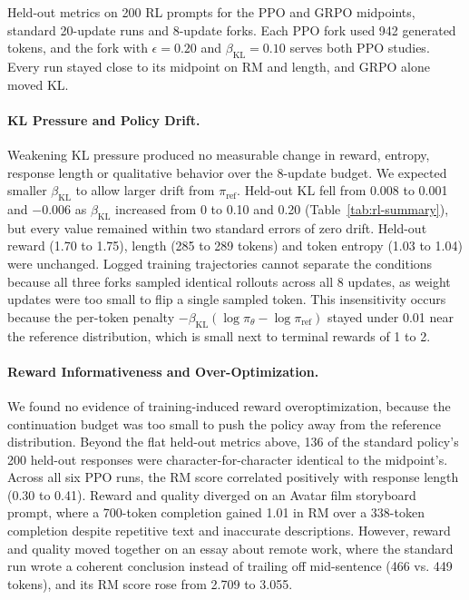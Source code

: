 \documentclass{article}
\newcommand{\tablebody}[1]{\small\setlength{\tabcolsep}{4pt}\begin{adjustbox}{max width=\linewidth}\end{adjustbox}}
\begin{document}
\begin{table}[!htb]
  \centering
  \caption{Held-out metrics on 200 RL prompts for the PPO and GRPO midpoints, standard 20-update runs and 8-update forks. Each PPO fork used 942 generated tokens, and the fork with $\epsilon = 0.20$ and $\beta_{\text{KL}} = 0.10$ serves both PPO studies. Every run stayed close to its midpoint on RM and length, and GRPO alone moved KL.}
  \label{tab:rl-summary}
  \tablebody{tables/x_rl_summary.tex}
\end{table}

\paragraph{KL Pressure and Policy Drift.} Weakening KL pressure produced no measurable change in reward, entropy, response length or qualitative behavior over the 8-update budget. We expected smaller $\beta_{\text{KL}}$ to allow larger drift from $\pi_{\text{ref}}$. Held-out KL fell from 0.008 to 0.001 and $-0.006$ as $\beta_{\text{KL}}$ increased from 0 to 0.10 and 0.20 (Table~\ref{tab:rl-summary}), but every value remained within two standard errors of zero drift. Held-out reward (1.70 to 1.75), length (285 to 289 tokens) and token entropy (1.03 to 1.04) were unchanged. Logged training trajectories cannot separate the conditions because all three forks sampled identical rollouts across all 8 updates, as weight updates were too small to flip a single sampled token. This insensitivity occurs because the per-token penalty $-\beta_{\text{KL}}(\log\pi_\theta - \log\pi_{\text{ref}})$ stayed under 0.01 near the reference distribution, which is small next to terminal rewards of 1 to 2.

\paragraph{Reward Informativeness and Over-Optimization.} We found no evidence of training-induced reward overoptimization, because the continuation budget was too small to push the policy away from the reference distribution. Beyond the flat held-out metrics above, 136 of the standard policy's 200 held-out responses were character-for-character identical to the midpoint's. Across all six PPO runs, the RM score correlated positively with response length (0.30 to 0.41). Reward and quality diverged on an Avatar film storyboard prompt, where a 700-token completion gained 1.01 in RM over a 338-token completion despite repetitive text and inaccurate descriptions. However, reward and quality moved together on an essay about remote work, where the standard run wrote a coherent conclusion instead of trailing off mid-sentence (466 vs. 449 tokens), and its RM score rose from 2.709 to 3.055.
\end{document}

